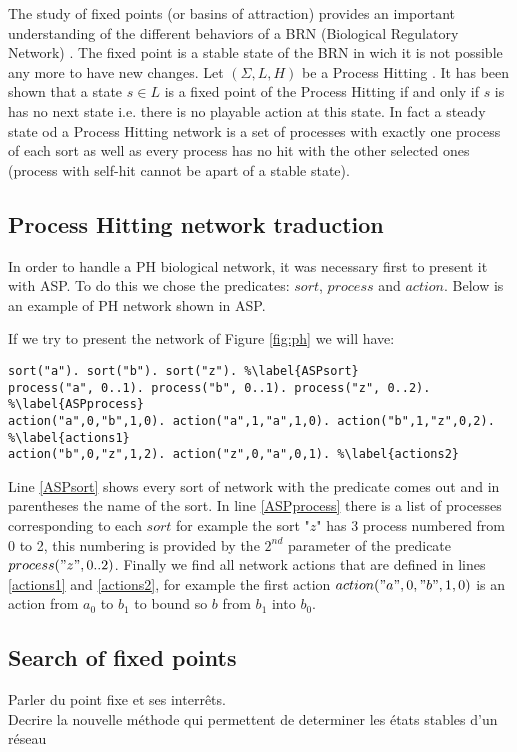 The study of fixed points (or basins of attraction) provides an important understanding of the different behaviors of a BRN (Biological Regulatory Network) \cite{wuensche1998genomic}.  
The fixed point is a stable state of the BRN in wich it is not possible any more to have new changes.
Let $(\Sigma, L, H)$ be a Process Hitting .
 It has been shown that a state $s \in L$ is a fixed point of the Process Hitting if and only if $s$ is has no next state \cite{pauleve2011modelisation} i.e. there is no playable action at this state. In fact a steady state od a Process Hitting network is a set of processes with exactly one process of each sort as well as every process has no hit with the other selected ones (process with self-hit cannot be apart of a stable state).

\subsection{Process Hitting network traduction }
In order to handle a PH biological network, it was necessary first to present it with ASP. To do this we chose the predicates: $sort$, $process$ and $action$. Below is an example of PH network shown in ASP.

\begin{example*} 
If we try to present the network of Figure \ref{fig:ph} we will have:
\begin{lstlisting}
sort("a"). sort("b"). sort("z"). %\label{ASPsort}
process("a", 0..1). process("b", 0..1). process("z", 0..2). %\label{ASPprocess}
action("a",0,"b",1,0). action("a",1,"a",1,0). action("b",1,"z",0,2). %\label{actions1}
action("b",0,"z",1,2). action("z",0,"a",0,1). %\label{actions2}
\end{lstlisting}
Line \ref{ASPsort} shows every sort of network with the predicate comes out and in parentheses the name of the sort. In line \ref{ASPprocess} there is a list of processes corresponding to each $sort$ for example the sort "$z$" has 3 process numbered from 0 to 2, this numbering is provided by the $2^{nd}$ parameter of the predicate $process("z", 0..2)$. Finally we find all network actions that are defined in lines \ref{actions1} and \ref{actions2}, for example the first action $action("a",0,"b",1,0)$ is an action from $a_0$ to $b_1$ to bound so $b$ from $b_1$ into $b_0$.
\end{example*}

\subsection{Search of fixed points }
Parler du point fixe et ses interrêts. \\
Decrire la nouvelle méthode qui permettent de determiner les états stables d'un réseau 

